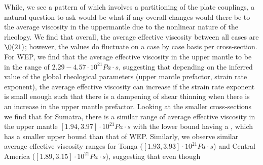 \documentclass[12pt]{article}
\begin{document}
{While, we see a pattern of which involves a partitioning of the plate couplings, a natural question to ask would be what if any overall changes would there be to the average viscosity in the uppermantle due to the nonlinear nature of the rheology. We find that overall, the average effective viscosity between all cases are $\mathcal{\O}(21)$; however, the values do fluctuate on a case by case basis per cross-section. For WEP, we find that the average effective viscosity in the upper mantle to be in the range of $2.29-4.57 \cdot 10^{21}Pa\cdot s$, suggesting that depending on the inferred value of the global rheological parameters (upper mantle prefactor, strain rate exponent), the average effective viscosity can increase if the strain rate exponent is small enough such that there is a dampening of shear thinning when there is an increase in the upper mantle prefactor. Looking at the smaller cross-sections we find that for Sumatra, there is a similar range of average effective viscosity in the upper mantle $[1.94,3.97]\cdot 10^{21}Pa\cdot s$ with the lower bound having a , which has a smaller upper bound than that of WEP. Similarly, we observe similar average effective viscosity ranges for Tonga ($[1.93,3.93]\cdot 10^{21}Pa\cdot s$) and Central America ($[1.89,3.15]\cdot 10^{21}Pa\cdot s$), suggesting that even though 


\begin{table}

\centering


\end{table}}
\end{document}

